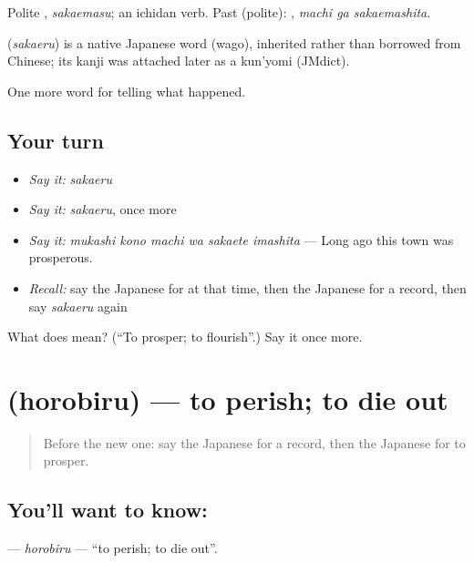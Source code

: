 Polite \textbf{}, \emph{sakaemasu}; an ichidan verb. Past (polite): \textbf{ }, \emph{machi ga sakaemashita}.

\begin{cousinweb}
\textbf{} (\emph{sakaeru}) is a native Japanese word (wago), inherited rather than borrowed from Chinese; its kanji was attached later as a kun'yomi (JMdict).
\end{cousinweb}

\begin{grammarlens}[title={What you've built}]
One more word for telling what happened.
\end{grammarlens}

\subsection*{Your turn}
\begin{itemize}
\raggedright
  \item \emph{Say it:} \emph{sakaeru}
  \item \emph{Say it:} \emph{sakaeru}, once more
  \item \emph{Say it:} \emph{mukashi kono machi wa sakaete imashita} — Long ago this town was prosperous.
  \item \emph{Recall:} say the Japanese for at that time, then the Japanese for a record, then say \emph{sakaeru} again
\end{itemize}

\begin{tcolorbox}[breakable,colback=teal!4,colframe=teal!35!black,title={Before you move on}]
What does  mean? (\textquotedblleft{}To prosper; to flourish\textquotedblright{}.) Say it once more.
\end{tcolorbox}
\section[\texorpdfstring{\ja{ほろびる} (horobiru)}{ほろびる (horobiru)}]{ (horobiru) — to perish; to die out}

\label{lesson:JA-C313-horobiru}



\begin{quote}
Before the new one: say the Japanese for a record, then the Japanese for to prosper.
\end{quote}

\subsection*{You'll want to know: }
\textbf{} — \emph{horobiru} — \textquotedblleft{}to perish; to die out\textquotedblright{}.

